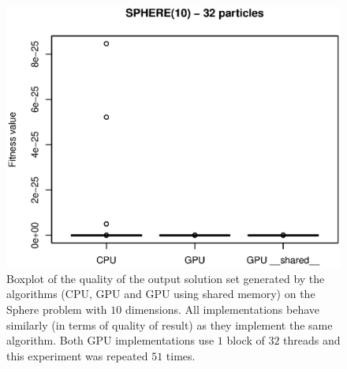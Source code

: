 \documentclass[conference]{IEEEtran}
\begin{document}
    \begin{figure}[!htb]
        \centering
        \includegraphics[width=\columnwidth]{../img/sphere10_32particles_fitness.eps}
        \caption{Boxplot of the quality of the output solution set generated by the algorithms (CPU, GPU and GPU using shared memory) on the Sphere problem with $10$ dimensions. All implementations behave similarly (in terms of quality of result) as they implement the same algorithm. Both GPU implementations use $1$ block of $32$ threads and this experiment was repeated $51$ times.}
        \label{fig:sphere10_32particles_fitness}
    \end{figure}
\end{document}
